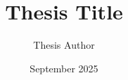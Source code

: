 \documentclass[12pt, eng, phd]{thesis}
\title{Thesis Title}{제목}
\author{Thesis Author}{작가}
\date{September 2025}{2025년 9월}
\begin{document}
\makecover
\setbodylayout
\frontmatter

\tableofcontents \clearpage
\listoffigures \clearpage
\listoftables \clearpage

\mainmatter



\backmatter
\makebibliography
\makeabstract
\end{document}

